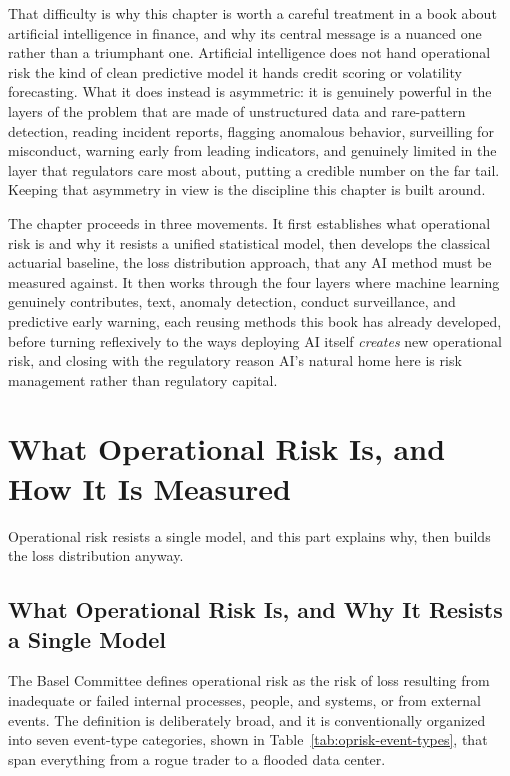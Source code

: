 \documentclass[../ai_in_finance]{subfiles}
\begin{document}
That difficulty is why this chapter is worth a careful treatment in a book about artificial intelligence in finance, and why its central message is a nuanced one rather than a triumphant one. Artificial intelligence does not hand operational risk the kind of clean predictive model it hands credit scoring or volatility forecasting. What it does instead is asymmetric: it is genuinely powerful in the layers of the problem that are made of unstructured data and rare-pattern detection, reading incident reports, flagging anomalous behavior, surveilling for misconduct, warning early from leading indicators, and genuinely limited in the layer that regulators care most about, putting a credible number on the far tail. Keeping that asymmetry in view is the discipline this chapter is built around.

The chapter proceeds in three movements. It first establishes what operational risk is and why it resists a unified statistical model, then develops the classical actuarial baseline, the loss distribution approach, that any AI method must be measured against. It then works through the four layers where machine learning genuinely contributes, text, anomaly detection, conduct surveillance, and predictive early warning, each reusing methods this book has already developed, before turning reflexively to the ways deploying AI itself \emph{creates} new operational risk, and closing with the regulatory reason AI's natural home here is risk management rather than regulatory capital.

\section{What Operational Risk Is, and How It Is Measured}

Operational risk resists a single model, and this part explains why, then builds the loss distribution anyway.

\subsection{What Operational Risk Is, and Why It Resists a Single Model}
\label{sec:oprisk-fundamentals}

The Basel Committee defines operational risk as the risk of loss resulting from inadequate or failed internal processes, people, and systems, or from external events. The definition is deliberately broad, and it is conventionally organized into seven event-type categories, shown in Table~\ref{tab:oprisk-event-types}, that span everything from a rogue trader to a flooded data center.
\end{document}
